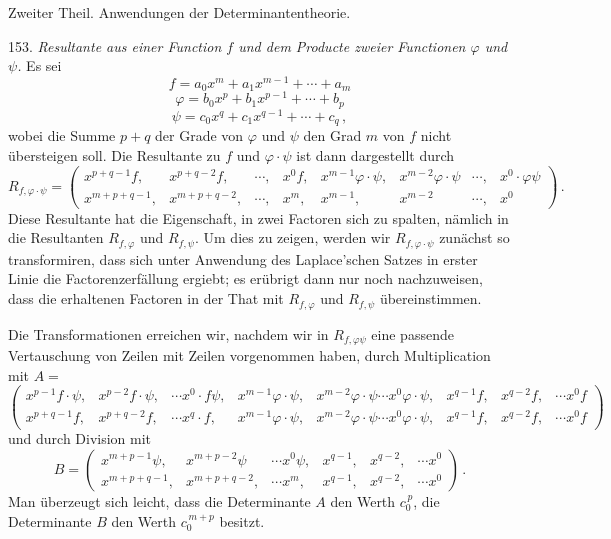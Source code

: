 Zweiter Theil. Anwendungen der Determinantentheorie.

153. \textit{Resultante aus einer Function $f$ und dem Producte zweier
Functionen $\varphi$ und $\psi$.} Es sei
\[
f = a_0 x^m + a_1 x^{m-1} + \cdots + a_m
\]
\[
\varphi = b_0 x^p + b_1 x^{p-1} + \cdots + b_p
\]
\[
\psi = c_0 x^q + c_1 x^{q-1} + \cdots + c_q\,,
\]
wobei die Summe $p+q$ der Grade von $\varphi$ und $\psi$ den Grad $m$
von $f$ nicht \"ubersteigen soll. Die Resultante zu $f$ und
$\varphi \cdot \psi$ ist dann dargestellt durch
\[
R_{f,\varphi\cdot\psi} =
\begin{pmatrix}
x^{p+q-1}f, & x^{p+q-2}f, & \cdots, & x^0f, & x^{m-1}\varphi\cdot\psi, & x^{m-2}\varphi\cdot\psi & \cdots, & x^0\cdot\varphi\psi \\
x^{m+p+q-1}, & x^{m+p+q-2}, & \cdots, & x^m, & x^{m-1}, & x^{m-2} & \cdots, & x^0
\end{pmatrix}\,.
\]
Diese Resultante hat die Eigenschaft, in zwei Factoren sich zu
spalten, n\"amlich in die Resultanten $R_{f,\varphi}$ und $R_{f,\psi}$.
Um dies zu zeigen, werden wir $R_{f,\varphi\cdot\psi}$ zun\"achst so
transformiren, dass sich unter Anwendung des Laplace'schen Satzes in
erster Linie die Factorenzerf\"allung ergiebt; es er\"ubrigt dann nur
noch nachzuweisen, dass die erhaltenen Factoren in der That mit
$R_{f,\varphi}$ und $R_{f,\psi}$ \"ubereinstimmen.

Die Transformationen erreichen wir, nachdem wir in $R_{f,\varphi\psi}$
eine passende Vertauschung von Zeilen mit Zeilen vorgenommen haben,
durch Multiplication mit $A =$
\[
\begin{pmatrix}
x^{p-1}f\cdot\psi, & x^{p-2}f\cdot\psi, & \cdots x^0\cdot f\psi, & x^{m-1}\varphi\cdot\psi, & x^{m-2}\varphi\cdot\psi \cdots x^0\varphi\cdot\psi, & x^{q-1}f, & x^{q-2}f, & \cdots x^0f \\
x^{p+q-1}f, & x^{p+q-2}f, & \cdots x^q\cdot f, & x^{m-1}\varphi\cdot\psi, & x^{m-2}\varphi\cdot\psi \cdots x^0\varphi\cdot\psi, & x^{q-1}f, & x^{q-2}f, & \cdots x^0f
\end{pmatrix}
\]
und durch Division mit
\[
B =
\begin{pmatrix}
x^{m+p-1}\psi, & x^{m+p-2}\psi & \cdots x^0\psi, & x^{q-1}, & x^{q-2}, & \cdots x^0 \\
x^{m+p+q-1}, & x^{m+p+q-2}, & \cdots x^m, & x^{q-1}, & x^{q-2}, & \cdots x^0
\end{pmatrix}\,.
\]
Man \"uberzeugt sich leicht, dass die Determinante $A$ den Werth
$c_0^{\,p}$, die Determinante $B$ den Werth $c_0^{\,m+p}$ besitzt.

